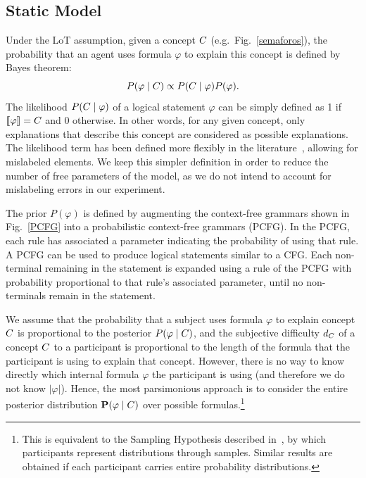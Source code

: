 \subsection{Static Model}

\newcommand{\form}{\varphi}
Under the LoT assumption,  given a concept $C$ (e.g.\ Fig.~\ref{semaforos}), the probability that an agent uses formula $\form$ to explain this concept is defined by Bayes theorem: 
$$
P(\form\mid \con) \propto P(\con\mid \form)P(\form).
\label{Bayes fix}
$$
%
The likelihood $P(\con\mid \form)$ of a logical statement $\form$ can be simply defined as 1 if $\sem{\form}=\con$ and 0 otherwise. In other words, for any given concept, only explanations that describe this concept are considered as possible explanations. The likelihood term has been defined more flexibly in the literature~\cite{goodman2008rational,piantadosi2016logical}, allowing for mislabeled elements. We keep this simpler definition in order to reduce the number of free parameters of the model, as we do not intend to account for mislabeling errors in our experiment.

The prior $P(\form)$ is defined by augmenting the context-free grammars shown in Fig.~\ref{PCFG} into a probabilistic context-free grammars (PCFG). In the PCFG, each rule has associated a parameter indicating the probability of using that rule. A PCFG can be used to produce logical statements similar to a CFG. Each non-terminal remaining in the statement is expanded using a rule of the PCFG with probability proportional to that rule's associated parameter, until no non-terminals remain in the statement. 

We assume that the probability that a subject uses formula $\form$ to explain concept $C$ is proportional to the posterior $P(\form \mid \con)$, and the subjective difficulty $d_C$ of a concept $C$ to a participant is proportional to the length of the formula that the participant is using to explain that concept. However, there is no way to know directly which internal formula $\form$ the participant is using (and therefore we do not know $|\form|$). Hence, the most parsimonious approach is to consider the entire posterior distribution $\textbf{P}(\form \mid \con)$ over possible formulas.\footnote{This is equivalent to the Sampling Hypothesis described in~\cite{denison2013rational}, by which participants represent distributions through samples. Similar results are obtained if each participant carries entire probability distributions.}

